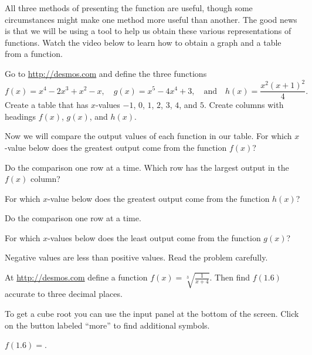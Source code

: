 \documentclass{ximera}
\begin{document}
All three methods of presenting the function are useful, though some circumstances might make one method more useful than another. The good news is that we will be using a tool to help us obtain these various representations of functions. Watch the video below to learn how to obtain a graph and a table from a function.

\begin{question}
Go to \href{http://desmos.com}{http://desmos.com} and define the three functions 
\[
f(x)=x^4-2x^3+x^2-x,\quad g(x)=x^5-4x^4+3,\quad\text{and}\quad h(x)=\frac{x^2(x+1)^2}{4}.
\]
Create a table that has $x$-values $-1$, $0$, $1$, $2$, $3$, $4$, and $5$. Create columns with headings $f(x)$, $g(x)$, and $h(x)$.

Now we will compare the output values of each function in our table. For which $x$-value below does the greatest output come from the function $f(x)$?

    \begin{multipleChoice}
    \end{multipleChoice}
    \begin{hint}
    Do the comparison one row at a time. Which row has the largest output in the $f(x)$ column?
    \end{hint}    
For which $x$-value below does the greatest output come from the function $h(x)$?
    \begin{multipleChoice}
    \end{multipleChoice}
    \begin{hint}
    Do the comparison one row at a time.
    \end{hint}
For which $x$-values below does the least output come from the function $g(x)$?
    \begin{multipleChoice}
    \end{multipleChoice}
    \begin{hint}
    Negative values are less than positive values. Read the problem carefully.
    \end{hint}

\end{question}

\begin{question}
At \href{http://desmos.com}{http://desmos.com} define a function $f(x)=\sqrt[3]{\frac{1}{x+4}}$. Then find $f(1.6)$ accurate to three decimal places.

\begin{hint}
To get a cube root you can use the input panel at the bottom of the screen. Click on the button labeled ``more'' to find additional symbols. 
\end{hint}
$f(1.6)=$.

\end{question}
\end{document}
